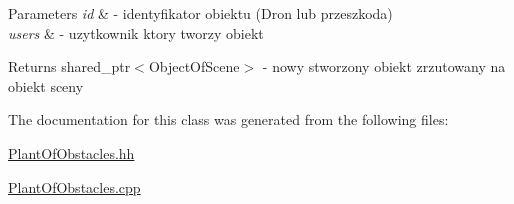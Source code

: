 \begin{DoxyParams}{Parameters}
{\em id} & -\/ identyfikator obiektu (Dron lub przeszkoda) \\
\hline
{\em users} & -\/ uzytkownik ktory tworzy obiekt \\
\hline
\end{DoxyParams}
\begin{DoxyReturn}{Returns}
shared\+\_\+ptr$<$\+Object\+Of\+Scene$>$ -\/ nowy stworzony obiekt zrzutowany na obiekt sceny 
\end{DoxyReturn}


The documentation for this class was generated from the following files\+:\begin{DoxyCompactItemize}
\item 
\hyperlink{_plant_of_obstacles_8hh}{Plant\+Of\+Obstacles.\+hh}\item 
\hyperlink{_plant_of_obstacles_8cpp}{Plant\+Of\+Obstacles.\+cpp}\end{DoxyCompactItemize}
